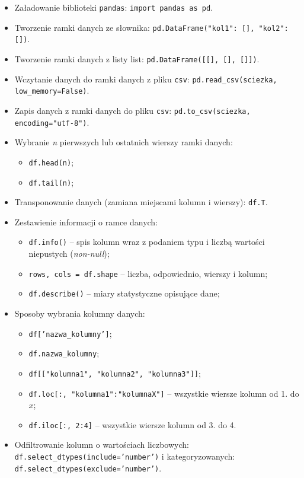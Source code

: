 \documentclass[11pt]{report}
\begin{document}
\begin{itemize}
    \item Załadowanie biblioteki \texttt{pandas}: \texttt{import pandas as pd}.
    \item Tworzenie ramki danych ze słownika: \texttt{pd.DataFrame({"kol1": [], "kol2": []})}.    
    \item Tworzenie ramki danych z listy list: \texttt{pd.DataFrame([[], [], []])}.
    \item Wczytanie danych do ramki danych z pliku \texttt{csv}: \texttt{pd.read\_csv(sciezka, low\_memory=False)}.
    \item Zapis danych z ramki danych do pliku \texttt{csv}: \texttt{pd.to\_csv(sciezka, encoding="utf-8")}.
    \item Wybranie \textit{n} pierwszych lub ostatnich wierszy ramki danych:
    \begin{itemize}
        \item \texttt{df.head(n)};
        \item \texttt{df.tail(n)};
    \end{itemize}
    \item Transponowanie danych (zamiana miejscami kolumn i wierszy): \texttt{df.T}.
    \item Zestawienie informacji o ramce danych:
    \begin{itemize}
        \item \texttt{df.info()} -- spis kolumn wraz z podaniem typu i liczbą wartości niepustych (\textit{non-null});
        \item \texttt{rows, cols = df.shape} -- liczba, odpowiednio, wierszy i kolumn;
        \item \texttt{df.describe()} -- miary statystyczne opisujące dane;
    \end{itemize}
    \item Sposoby wybrania kolumny danych:
    \begin{itemize}
        \item \texttt{df['nazwa\_kolumny']};
        \item \texttt{df.nazwa\_kolumny};
        \item \texttt{df[["kolumna1", "kolumna2", "kolumna3"]]};
        \item \texttt{df.loc[:, "kolumna1":"kolumnaX"]} -- wszystkie wiersze kolumn od 1. do $x$;
        \item \texttt{df.iloc[:, 2:4]} -- wszystkie wiersze kolumn od 3. do 4.
    \end{itemize}
    \item Odfiltrowanie kolumn o wartościach liczbowych: \texttt{df.select\_dtypes(include='number')} i kategoryzowanych: \texttt{df.select\_dtypes(exclude='number')}.

\end{itemize}
\end{document}
